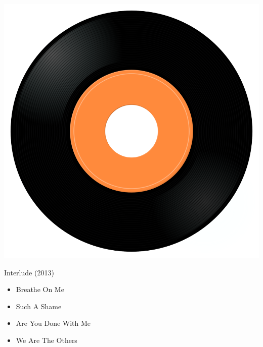 \begin{minipage}[t]{0.25\textwidth}
\captionsetup{type=figure}
\includegraphics[width=\textwidth]{Images/cover.png}
\caption*{Interlude (2013)}
\end{minipage}
\begin{minipage}[t]{0.25\textwidth}\vspace{0pt}
\begin{itemize}[nosep,leftmargin=1em,labelwidth=*,align=left]
	\setlength{\itemsep}{0pt}
	\item Breathe On Me
	\item Such A Shame
	\item Are You Done With Me
	\item We Are The Others
\end{itemize}
\end{minipage}
